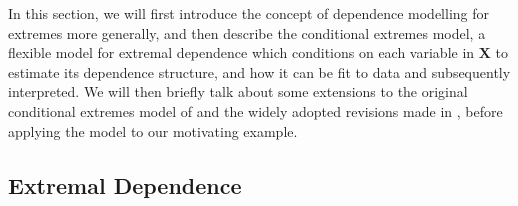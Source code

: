 \documentclass{article}
\numberwithin{equation}{section}
\begin{document}
In this section, we will first introduce the concept of dependence modelling for extremes more generally, and then describe the conditional extremes model, a flexible model for extremal dependence which conditions on each variable in $\bm{X}$ to estimate its dependence structure, and how it can be fit to data and subsequently interpreted.
We will then briefly talk about some extensions to the original conditional extremes model of \cite{Heffernan2004} and the widely adopted revisions made in \cite{Keef2013}, before applying the model to our motivating example.

\subsection{Extremal Dependence}
\end{document}
